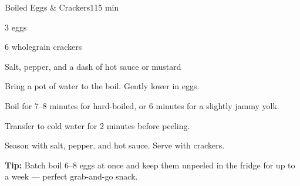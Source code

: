 \begin{recipebox}{Boiled Eggs \& Crackers}{1}{15 min}
\begin{ingredients}
  \item 3 eggs
  \item 6 wholegrain crackers
  \item Salt, pepper, and a dash of hot sauce or mustard
\end{ingredients}

\begin{method}
  \item Bring a pot of water to the boil. Gently lower in eggs.
  \item Boil for 7--8 minutes for hard-boiled, or 6 minutes for a slightly jammy yolk.
  \item Transfer to cold water for 2 minutes before peeling.
  \item Season with salt, pepper, and hot sauce. Serve with crackers.
\end{method}

\begin{notelist}
  \item \textbf{Tip:} Batch boil 6--8 eggs at once and keep them unpeeled in the fridge for up to a week --- perfect grab-and-go snack.
\end{notelist}
\end{recipebox}
